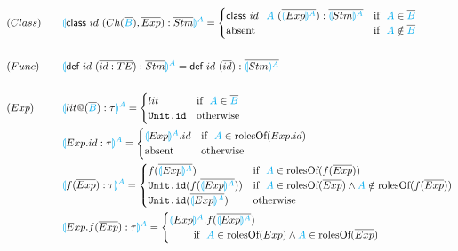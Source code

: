\documentclass{thesis}
\newcommand{\projection}[2]{{\color{cyan}\llparenthesis}#1{\color{cyan}\rrparenthesis^#2}}
\newcommand{\gray}[1]{\textbf{\textsf{\color{Gray}#1}}}
\newcommand{\cyan}[1]{\color{cyan}#1}
\begin{document}
\begin{alignat*}{2}
  &(Class)~~~ &&\projection{\textsf{class} ~id~(Ch(\overline{\cyan{B}}),\overline{Exp}):\overline{Stm}}{A}=
  \begin{cases}
    \textsf{class} ~id\_{\cyan{A}}~(\overline{\projection{Exp}{A}}):\overline{\projection{Stm}{A}} & \text{if}~~ {\cyan{A}} \in \overline{\cyan{B}}\\
    \text{absent} & \text{if}~~ {\cyan{A}} \notin \overline{\cyan{B}}
  \end{cases}\\
  \\
  &(Func)~~~ &&\projection{\textsf{def} ~id~(\overline{id:TE}):\overline{Stm}}{A} = \textsf{def} ~id~ (\overline{id}):\overline{\projection{Stm}{A}}\\
  \\
  &(Exp)~~~ &&\projection{lit\gray{@}(\overline{\color{cyan}{B}}):\tau}{A}=
  \begin{cases}
    lit & \text{if}~~ {\color{cyan}A} \in \overline{\color{cyan}{B}}\\
    \texttt{Unit.id} &\text{otherwise}
  \end{cases}\\
  &&&\projection{Exp.id:\tau}{A}=
  \begin{cases}
    \projection{Exp}{A}.id &\text{if}~~{\color{cyan}A} \in \text{rolesOf} (Exp.id)\\
    \text{absent} &\text{otherwise}
  \end{cases}\\
  &&&\projection{f(\overline{Exp}):\tau}{A} =
  \begin{cases}
    f(\overline{\projection{Exp}{A}}) &\text{if}~~ {\color{cyan}A} \in \text{rolesOf} (f(\overline{Exp}))\\
    \texttt{Unit.id}(f(\overline{\projection{Exp}{A}})) &\text{if}~~ {\color{cyan}A} \in \text{rolesOf}(\overline{Exp}) \wedge {\color{cyan}A} \notin \text{rolesOf} (f(\overline{Exp}))\\
    \texttt{Unit.id}(\overline{\projection{Exp}{A}}) &\text{otherwise}
  \end{cases}\\
  &&&\projection{Exp.f(\overline{Exp}):\tau}{A}=
  \begin{cases}
    \projection{Exp}{A}.f(\overline{\projection{Exp}{A}}) \\
    ~~~~~~~\text{if}~~ {\color{cyan}A} \in \text{rolesOf}(Exp) \wedge {\color{cyan}A} \in \text{rolesOf}(\overline{Exp})\\

\end{cases}
\end{alignat*}
\end{document}
